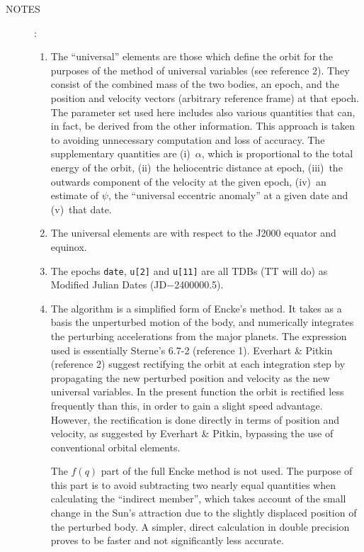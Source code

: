 \documentclass[11pt,fleqn,twoside]{article}
\renewcommand{\_}{{\tt\char'137}}     %
\newlength{\oldspacing}
\newcommand{\notes}[1]
{
  \goodbreak
  \setlength{\oldspacing}{\topsep}
  \setlength{\topsep}{0.3ex}
  \begin{description}
    \item[NOTES]:
        #1
  \end{description}
  \setlength{\topsep}{\oldspacing}
}
\begin{document}
\notes
{
 \begin{enumerate}
  \setlength{\parskip}{\medskipamount}
  \item The ``universal'' elements are those which define the orbit for the
        purposes of the method of universal variables (see reference 2).
        They consist of the combined mass of the two bodies, an epoch,
        and the position and velocity vectors (arbitrary reference frame)
        at that epoch.  The parameter set used here includes also various
        quantities that can, in fact, be derived from the other
        information.  This approach is taken to avoiding unnecessary
        computation and loss of accuracy.  The supplementary quantities
        are (i)~$\alpha$, which is proportional to the total energy of the
        orbit, (ii)~the heliocentric distance at epoch,
        (iii)~the outwards component of the velocity at the given epoch,
        (iv)~an estimate of $\psi$, the ``universal eccentric anomaly'' at a
        given date and (v)~that date.
 
  \item The universal elements are with respect to the J2000 equator and
        equinox.
 
  \item The epochs {\tt date}, {\tt u[2]} and {\tt u[11]}
        are all TDBs (TT will do) as Modified Julian Dates (JD$-$2400000.5).
 
  \item The algorithm is a simplified form of Encke's method.  It takes as
        a basis the unperturbed motion of the body, and numerically
        integrates the perturbing accelerations from the major planets.
        The expression used is essentially Sterne's 6.7-2 (reference 1).
        Everhart \& Pitkin (reference 2) suggest rectifying the orbit at
        each integration step by propagating the new perturbed position
        and velocity as the new universal variables.  In the present
        function the orbit is rectified less frequently than this, in order
        to gain a slight speed advantage.  However, the rectification is
        done directly in terms of position and velocity, as suggested by
        Everhart \& Pitkin, bypassing the use of conventional orbital
        elements.
 
        The $f(q)$ part of the full Encke method is not used.  The purpose
        of this part is to avoid subtracting two nearly equal quantities
        when calculating the ``indirect member'', which takes account of the
        small change in the Sun's attraction due to the slightly displaced
        position of the perturbed body.  A simpler, direct calculation in
        double precision proves to be faster and not significantly less
        accurate.
 

\end{enumerate}}
\end{document}
